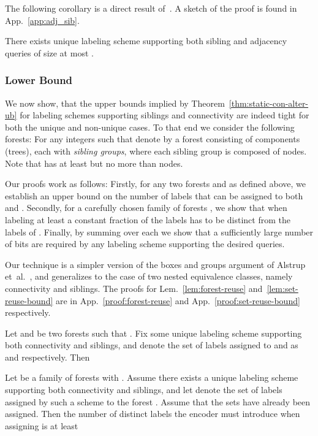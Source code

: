 \documentclass{llncs}
\begin{document}
The following corollary is a direct result of~\cite{Alstrup02,Alstrup05}. A
sketch of the proof is found in App.~\ref{app:adj_sib}.
\begin{corollary}\label{cor:adj_sib_static}
There exists unique labeling scheme supporting both sibling and adjacency  queries of size at most .
\end{corollary}

\subsubsection{Lower Bound}
We now show, that the upper bounds implied  by Theorem~\ref{thm:static-con-alter-ub} for labeling schemes supporting siblings and connectivity  are indeed tight for both the unique and non-unique  cases.
To that end we consider the following forests: For any integers  such that 
denote by  a forest consisting of 
components (trees), each with  \emph{sibling groups}, where each sibling
group is composed of  nodes. Note that  has at least
 but no more than  nodes.

Our proofs work as follows:
Firstly, for any two forests  and  as defined above, we
        establish an upper bound on the number of labels that can be assigned
        to both  and .
Secondly, for a carefully chosen family of forests , we  show that when labeling  at least
        a constant fraction of the labels has to be distinct from the labels of
        .
Finally,  by summing over each  we show that a sufficiently
        large number of bits are required by any labeling scheme supporting the
        desired queries.
        
Our technique is a simpler version of the boxes and groups argument of Alstrup et~al.~\cite{Alstrup05}, and generalizes to the case of two nested equivalence classes, namely connectivity and siblings. The proofs for Lem.~\ref{lem:forest-reuse} and~\ref{lem:set-reuse-bound} are in 
App.~\ref{proof:forest-reuse} and App.~\ref{proof:set-reuse-bound} respectively.

\begin{lemma}\label{lem:forest-reuse}
    Let  and  be two forests such that .
    Fix some unique labeling scheme supporting both
    connectivity and siblings, and denote the set of labels assigned to
     and  as  and  respectively.
	Then
    
\end{lemma}


\begin{lemma}\label{lem:set-reuse-bound}
    Let  be a family of forests with
    . Assume there exists a unique
    labeling scheme supporting both connectivity and siblings, and let 
    denote the set of labels assigned by such a scheme to the forest
    . Assume that the sets  have already
    been assigned. Then the number of distinct labels the encoder must
    introduce when assigning  is at least
    
\end{lemma}
\end{document}
